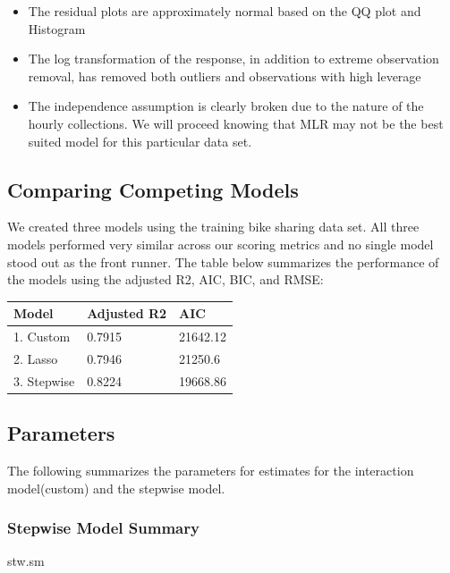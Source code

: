 \documentclass[american,]{article}
\newenvironment{Shaded}{\begin{snugshade}}{\end{snugshade}}
\newcommand{\NormalTok}[1]{#1}
\providecommand{\tightlist}{%
  \setlength{\itemsep}{0pt}\setlength{\parskip}{0pt}}
\begin{document}
\begin{itemize}
\tightlist
\item
  The residual plots are approximately normal based on the QQ plot and Histogram
\item
  The log transformation of the response, in addition to extreme observation removal, has removed both outliers and observations with high leverage
\item
  The independence assumption is clearly broken due to the nature of the hourly collections. We will proceed knowing that MLR may not be the best suited model for this particular data set.
\end{itemize}

\hypertarget{comparing-competing-models}{%
\subsection{Comparing Competing Models}\label{comparing-competing-models}}

We created three models using the training bike sharing data set. All three models performed very similar across our scoring metrics and no single model stood out as the front runner. The table below summarizes the performance of the models using the adjusted R2, AIC, BIC, and RMSE:

\begin{longtable}[]{@{}lll@{}}
\toprule
Model & Adjusted R2 & AIC\tabularnewline
\midrule
\endhead
1. Custom & 0.7915 & 21642.12\tabularnewline
2. Lasso & 0.7946 & 21250.6\tabularnewline
3. Stepwise & 0.8224 & 19668.86\tabularnewline
\bottomrule
\end{longtable}

\newpage

\hypertarget{parameters}{%
\subsection{Parameters}\label{parameters}}

The following summarizes the parameters for estimates for the interaction model(custom) and the stepwise model.

\newpage

\hypertarget{stepwise-model-summary}{%
\subsubsection{Stepwise Model Summary}\label{stepwise-model-summary}}

\begin{Shaded}
\begin{Highlighting}[]
\NormalTok{stw.sm}
\end{Highlighting}
\end{Shaded}
\end{document}
